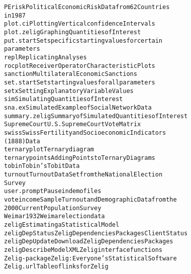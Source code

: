\begin{Details}
\begin{alltt}
PErisk                  Political Economic Risk Data from 62 Countries
                        in 1987
plot.ci                 Plotting Vertical confidence Intervals
plot.zelig              Graphing Quantities of Interest
put.start               Set specific starting values for certain
                        parameters
repl                    Replicating Analyses
rocplot                 Receiver Operator Characteristic Plots
sanction                Multilateral Economic Sanctions
set.start               Set starting values for all parameters
setx                    Setting Explanatory Variable Values
sim                     Simulating Quantities of Interest
sna.ex                  Simulated Example of Social Network Data
summary.zelig           Summary of Simulated Quantities of Interest
SupremeCourt            U.S. Supreme Court Vote Matrix
swiss                   Swiss Fertility and Socioeconomic Indicators
                        (1888) Data
ternaryplot             Ternary diagram
ternarypoints           Adding Points to Ternary Diagrams
tobin                   Tobin's Tobit Data
turnout                 Turnout Data Set from the National Election
                        Survey
user.prompt             Pause in demo files
voteincome              Sample Turnout and Demographic Data from the
                        2000 Current Population Survey
Weimar                  1932 Weimar election data
zelig                   Estimating a Statistical Model
zeligDepStatus          Zelig Dependencies Packages Client Status
zeligDepUpdate          Download Zelig Dependencies Packages
zeligDescribeModelXML   Zelig interface functions
Zelig-package           Zelig: Everyone's Statistical Software
Zelig.url               Table of links for Zelig
\end{alltt}


\end{Details}
